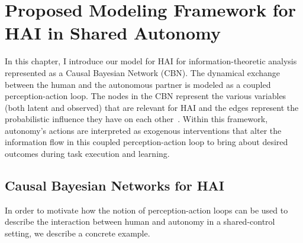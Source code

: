 \documentclass[12pt]{article}
\newcommand{\DGc}[1]{{\textbf{\color{blue}{#1}}}}
\begin{document}
% 
%
%
%

%
%
%
%

\pagebreak
\section{Proposed Modeling Framework for HAI in Shared Autonomy}
In this chapter, I introduce our model for HAI for information-theoretic analysis represented as a Causal Bayesian Network (CBN). The dynamical exchange between the human and the autonomous partner is modeled as a coupled perception-action loop. The nodes in the CBN represent the various variables (both latent and observed) that are relevant for HAI and the edges represent the probabilistic influence they have on each other~\cite{tishby2011information}. 
Within this framework, autonomy's actions are interpreted as exogenous interventions that alter the information flow in this coupled perception-action loop to bring about desired outcomes during task execution and learning.


\subsection{Causal Bayesian Networks for HAI}

In order to motivate how the notion of perception-action loops can be used to describe the interaction between human and autonomy in a shared-control setting, we describe a concrete example.
\end{document}

